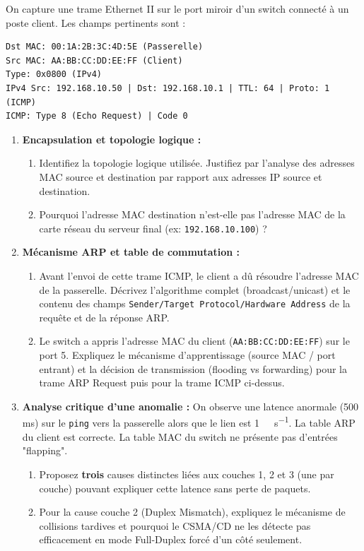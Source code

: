 \documentclass[11pt]{article}
\begin{document}
\begin{exercice}
On capture une trame Ethernet II sur le port miroir d'un switch connecté à un poste client. Les champs pertinents sont :
\begin{verbatim}
Dst MAC: 00:1A:2B:3C:4D:5E (Passerelle)
Src MAC: AA:BB:CC:DD:EE:FF (Client)
Type: 0x0800 (IPv4)
IPv4 Src: 192.168.10.50 | Dst: 192.168.10.1 | TTL: 64 | Proto: 1 (ICMP)
ICMP: Type 8 (Echo Request) | Code 0
\end{verbatim}

\begin{enumerate}
    \item \textbf{Encapsulation et topologie logique :} 
    \begin{enumerate}
        \item Identifiez la topologie logique utilisée. Justifiez par l'analyse des adresses MAC source et destination par rapport aux adresses IP source et destination.
        \item Pourquoi l'adresse MAC destination n'est-elle pas l'adresse MAC de la carte réseau du serveur final (ex: \texttt{192.168.10.100}) ?
    \end{enumerate}

    \item \textbf{Mécanisme ARP et table de commutation :} 
    \begin{enumerate}
        \item Avant l'envoi de cette trame ICMP, le client a dû résoudre l'adresse MAC de la passerelle. Décrivez l'algorithme complet (broadcast/unicast) et le contenu des champs \texttt{Sender/Target Protocol/Hardware Address} de la requête et de la réponse ARP.
        \item Le switch a appris l'adresse MAC du client (\texttt{AA:BB:CC:DD:EE:FF}) sur le port 5. Expliquez le mécanisme d'apprentissage (source MAC / port entrant) et la décision de transmission (flooding vs forwarding) pour la trame ARP Request puis pour la trame ICMP ci-dessus.
    \end{enumerate}

    \item \textbf{Analyse critique d'une anomalie :} 
    On observe une latence anormale (500 ms) sur le \texttt{ping} vers la passerelle alors que le lien est \SI{1}{\giga\bit\per\second}. La table ARP du client est correcte. La table MAC du switch ne présente pas d'entrées "flapping". 
    \begin{enumerate}
        \item Proposez \textbf{trois} causes distinctes liées aux couches 1, 2 et 3 (une par couche) pouvant expliquer cette latence sans perte de paquets.
        \item Pour la cause couche 2 (Duplex Mismatch), expliquez le mécanisme de collisions tardives et pourquoi le CSMA/CD ne les détecte pas efficacement en mode Full-Duplex forcé d'un côté seulement.
    \end{enumerate}
\end{enumerate}
\end{exercice}
\end{document}
